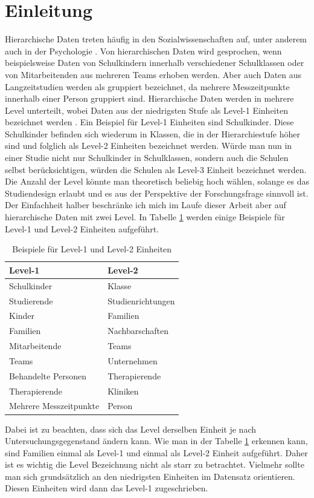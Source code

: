 \documentclass[12pt, a4paper]{article}\usepackage[]{graphicx}\usepackage[]{color}
\begin{document}
\newpage

\section{Einleitung}
Hierarchische Daten treten häufig in den Sozialwissenschaften auf, unter anderem auch in der Psychologie \citep{SnijdersTomA.B2012Ma:a}. Von hierarchischen Daten wird gesprochen, wenn beispielsweise Daten von Schulkindern innerhalb verschiedener Schulklassen oder von Mitarbeitenden aus mehreren Teams erhoben werden. Aber auch Daten aus Langzeitstudien werden als gruppiert bezeichnet, da mehrere Messzeitpunkte innerhalb einer Person gruppiert sind. Hierarchische Daten werden in mehrere Level unterteilt, wobei Daten aus der niedrigsten Stufe als Level-1 Einheiten bezeichnet werden \citep{SnijdersTomA.B2012Ma:a}. Ein Beispiel für Level-1 Einheiten sind Schulkinder. Diese Schulkinder befinden sich wiederum in Klassen, die in der Hierarchiestufe höher sind und folglich als Level-2 Einheiten bezeichnet werden. Würde man nun in einer Studie nicht nur Schulkinder in Schulklassen, sondern auch  die Schulen selbst berücksichtigen, würden die Schulen als Level-3 Einheit bezeichnet werden. Die Anzahl der Level könnte man theoretisch beliebig hoch wählen, solange es das Studiendesign erlaubt und es aus der Perspektive der Forschungsfrage sinnvoll ist. Der Einfachheit halber beschränke ich mich im Laufe dieser Arbeit aber auf hierarchische Daten mit zwei Level. In Tabelle \ref{tab:beispiele_levels} werden einige Beispiele für Level-1 und Level-2 Einheiten aufgeführt. 
\begin{table}[b!]
\centering
\begin{threeparttable}
\caption{Beispiele für Level-1 und Level-2 Einheiten}
\begin{tabular}{ll}
\toprule
Level-1 				& Level-2 	\\
\midrule
Schulkinder 			& Klasse 	\\
Studierende 			& Studienrichtungen \\
Kinder 					& Familien 	\\
Familien 				& Nachbarschaften \\
Mitarbeitende			& Teams \\
Teams					& Unternehmen \\
Behandelte Personen	 	& Therapierende \\
Therapierende 			& Kliniken \\
Mehrere Messzeitpunkte 	& Person \\
\bottomrule
\end{tabular}
\label{tab:beispiele_levels}
\end{threeparttable}
\end{table}
Dabei ist zu beachten, dass sich das Level derselben Einheit je nach Untersuchungsgegenstand ändern kann. Wie man in der Tabelle \ref{tab:beispiele_levels} erkennen kann, sind Familien einmal als Level-1 und einmal als Level-2 Einheit aufgeführt. Daher ist es wichtig die Level Bezeichnung nicht als starr zu betrachtet. Vielmehr sollte man sich grundsätzlich an den niedrigsten Einheiten im Datensatz orientieren. Diesen Einheiten wird dann das Level-1 zugeschrieben.
\end{document}
